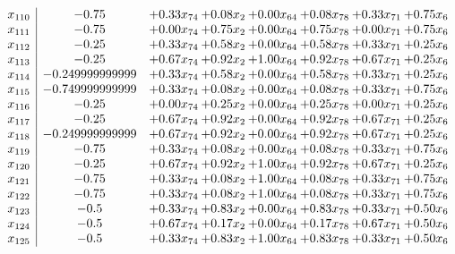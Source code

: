 \documentclass[8pt]{article}
\begin{document}
\[\begin{array}{c| c c@{\hskip 2pt} c@{\hskip 2pt} c@{\hskip 2pt} c@{\hskip 2pt} c@{\hskip 2pt} c@{\hskip 2pt} }
 x_{110}   &  -0.75 & +  0.33 x_{74} & +  0.08 x_{2} & +  0.00 x_{64} & +  0.08 x_{78} & +  0.33 x_{71} & +  0.75 x_{6}\\
 x_{111}   &  -0.75 & +  0.00 x_{74} & +  0.75 x_{2} & +  0.00 x_{64} & +  0.75 x_{78} & +  0.00 x_{71} & +  0.75 x_{6}\\
 x_{112}   &  -0.25 & +  0.33 x_{74} & +  0.58 x_{2} & +  0.00 x_{64} & +  0.58 x_{78} & +  0.33 x_{71} & +  0.25 x_{6}\\
 x_{113}   &  -0.25 & +  0.67 x_{74} & +  0.92 x_{2} & +  1.00 x_{64} & +  0.92 x_{78} & +  0.67 x_{71} & +  0.25 x_{6}\\
 x_{114}   &  -0.249999999999 & +  0.33 x_{74} & +  0.58 x_{2} & +  0.00 x_{64} & +  0.58 x_{78} & +  0.33 x_{71} & +  0.25 x_{6}\\
 x_{115}   &  -0.749999999999 & +  0.33 x_{74} & +  0.08 x_{2} & +  0.00 x_{64} & +  0.08 x_{78} & +  0.33 x_{71} & +  0.75 x_{6}\\
 x_{116}   &  -0.25 & +  0.00 x_{74} & +  0.25 x_{2} & +  0.00 x_{64} & +  0.25 x_{78} & +  0.00 x_{71} & +  0.25 x_{6}\\
 x_{117}   &  -0.25 & +  0.67 x_{74} & +  0.92 x_{2} & +  0.00 x_{64} & +  0.92 x_{78} & +  0.67 x_{71} & +  0.25 x_{6}\\
 x_{118}   &  -0.249999999999 & +  0.67 x_{74} & +  0.92 x_{2} & +  0.00 x_{64} & +  0.92 x_{78} & +  0.67 x_{71} & +  0.25 x_{6}\\
 x_{119}   &  -0.75 & +  0.33 x_{74} & +  0.08 x_{2} & +  0.00 x_{64} & +  0.08 x_{78} & +  0.33 x_{71} & +  0.75 x_{6}\\
 x_{120}   &  -0.25 & +  0.67 x_{74} & +  0.92 x_{2} & +  1.00 x_{64} & +  0.92 x_{78} & +  0.67 x_{71} & +  0.25 x_{6}\\
 x_{121}   &  -0.75 & +  0.33 x_{74} & +  0.08 x_{2} & +  1.00 x_{64} & +  0.08 x_{78} & +  0.33 x_{71} & +  0.75 x_{6}\\
 x_{122}   &  -0.75 & +  0.33 x_{74} & +  0.08 x_{2} & +  1.00 x_{64} & +  0.08 x_{78} & +  0.33 x_{71} & +  0.75 x_{6}\\
 x_{123}   &  -0.5 & +  0.33 x_{74} & +  0.83 x_{2} & +  0.00 x_{64} & +  0.83 x_{78} & +  0.33 x_{71} & +  0.50 x_{6}\\
 x_{124}   &  -0.5 & +  0.67 x_{74} & +  0.17 x_{2} & +  0.00 x_{64} & +  0.17 x_{78} & +  0.67 x_{71} & +  0.50 x_{6}\\
 x_{125}   &  -0.5 & +  0.33 x_{74} & +  0.83 x_{2} & +  1.00 x_{64} & +  0.83 x_{78} & +  0.33 x_{71} & +  0.50 x_{6}\\

\end{array}\]
\end{document}
